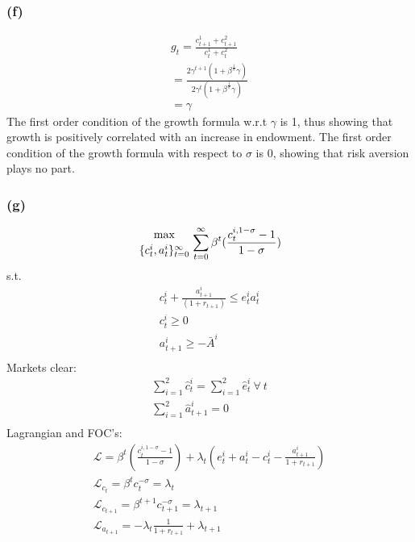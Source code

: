 \documentclass[10pt, a4paper]{article}
\begin{document}
    \subsubsection*{(f)}
      \begin{gather*}
        g_t = \frac{c_{t+1}^1 + c_{t+1}^2}{c_t^1+c_t^2} \\
        = \frac{2\gamma^{t+1}(1+\beta^{\frac{1}{\sigma}}\gamma)}{2\gamma^t(1+\beta^{\frac{1}{\sigma}}\gamma)} \\
        = \gamma
      \end{gather*}
      The first order condition of the growth formula w.r.t $\gamma$ is 1, thus showing that growth is positively correlated with an increase in endowment. The first order condition of the growth formula with respect to $\sigma$ is 0, showing that risk aversion plays no part. 
    \subsubsection*{(g)}
      \begin{gather*}
        {\max\atop{\{c_t^i,a_t^i\}_{t=0}^{\infty}}}\sum\limits_{t=0}^{\infty}\beta^t(\frac{c_t^{i, 1-\sigma}-1}{1-\sigma})
      \end{gather*}
      s.t.
      \begin{gather*}
        c_t^i + \frac{a_{t+1}^i}{(1+r_{t+1})} \leq e_t^ia_t^i \\
        c_t^i\geq 0 \\
        a_{t+1}^i\geq -\bar{A}^i \\
      \end{gather*}
      Markets clear:
      \begin{gather*}
        \sum\limits_{i=1}^2\hat{c}_t^i = \sum\limits_{i=1}^2\hat{e}_t^i \ \forall \ t\\
        \sum\limits_{i=1}^2 \hat{a}_{t+1}^i = 0 \\
      \end{gather*}
      Lagrangian and FOC's:
      \begin{gather*}
        \mathcal{L} = \beta^t(\frac{c_t^{i, 1-\sigma}-1}{1-\sigma}) + \lambda_t(e_t^i + a_t^i - c_t^i - \frac{a_{t+1}^i}{1+r_{t+1}}) \\
        \mathcal{L}_{c_t} = \beta^tc_t^{-\sigma} = \lambda_t \\
        \mathcal{L}_{c_{t+1}} = \beta^{t+1}c_{t+1}^{-\sigma} = \lambda_{t+1} \\
        \mathcal{L}_{a_{t+1}} = -\lambda_t\frac{1}{1+r_{t+1}}+\lambda_{t+1}
      \end{gather*}
\end{document}
